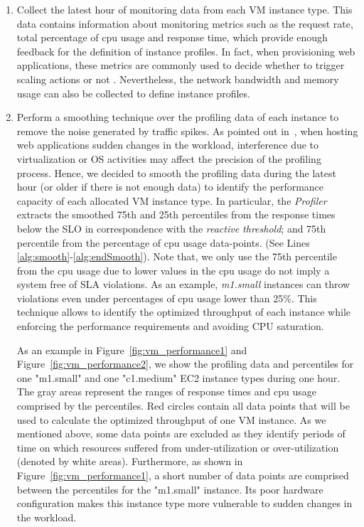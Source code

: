 \begin{enumerate}
\item Collect the latest hour of monitoring data from each VM instance type. This data contains information about monitoring metrics such as the request rate, total percentage of cpu usage and response time, which provide enough feedback for the definition of instance profiles. In fact, when provisioning web applications, these metrics are commonly used to decide whether to trigger scaling actions or not \cite{smartscale_2012,urgaonkar_agile_2008}. Nevertheless, the network bandwidth and memory usage can also be collected to define instance profiles.


\item Perform a smoothing technique over the profiling data of each instance to remove the noise generated by traffic spikes. As pointed out in~\cite{gandhi_hybrid_2012}, when hosting web applications sudden changes in the workload, interference due to virtualization or OS activities may affect the precision of the profiling process. Hence, we decided to smooth the profiling data during the latest hour (or older if there is not enough data) to identify the performance capacity of each allocated VM instance type. In particular, the \emph{Profiler} extracts the smoothed 75th and 25th percentiles from the response times below the SLO in correspondence with the \emph{reactive threshold}; and 75th percentile from the percentage of cpu usage data-points. (See Lines \ref{alg:smooth}-\ref{alg:endSmooth}). Note that, we only use the 75th percentile from the cpu usage due to lower values in the cpu usage do not imply a system free of SLA violations. As an example, \emph{m1.small} instances can throw violations even under percentages of cpu usage lower than 25\%. This technique allows to identify the optimized throughput of each instance while enforcing the performance requirements and avoiding CPU saturation. 

As an example in Figure~\ref{fig:vm_performance1} and Figure~\ref{fig:vm_performance2}, we show the profiling data and percentiles for one "m1.small" and one "c1.medium" EC2 instance types during one hour. The gray areas represent the ranges of response times and cpu usage comprised by the percentiles. Red circles contain all data points that will be used to calculate the optimized throughput of one VM instance. As we mentioned above, some data points are excluded as they identify periods of time on which resources suffered from under-utilization or over-utilization (denoted by white areas). Furthermore, as shown in Figure~\ref{fig:vm_performance1}, a short number of data points are comprised between the percentiles for the "m1.small" instance. Its poor hardware configuration makes this instance type more vulnerable to sudden changes in the workload.


\end{enumerate}
